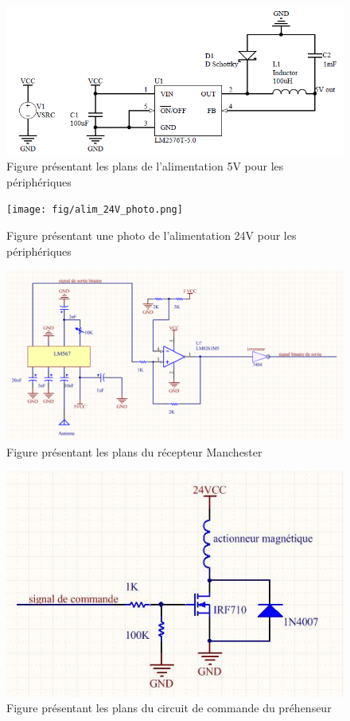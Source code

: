 \begin{figure}[htbp]
\centering
\includegraphics[scale=0.5]{fig/alim_5V.png}
\caption{Figure présentant les plans de l'alimentation 5V pour les périphériques}
\label{fig:alim5V}
\end{figure}

\begin{figure}[htbp]
\centering
\texttt{[image: fig/alim\_24V\_photo.png]}
\caption{Figure présentant une photo de l'alimentation 24V pour les périphériques}
\label{fig:alim24Vphoto}
\end{figure}

\begin{figure}[htbp]
\centering
\includegraphics[scale=0.5]{fig/plan_manchester.png}
\caption{Figure présentant les plans du récepteur Manchester}
\label{fig:manchester}
\end{figure}

\begin{figure}[htbp]
\centering
\includegraphics[scale=0.5]{fig/prehenseur.jpg}
\caption{Figure présentant les plans du circuit de commande du préhenseur}
\label{fig:prehenseur}
\end{figure}

